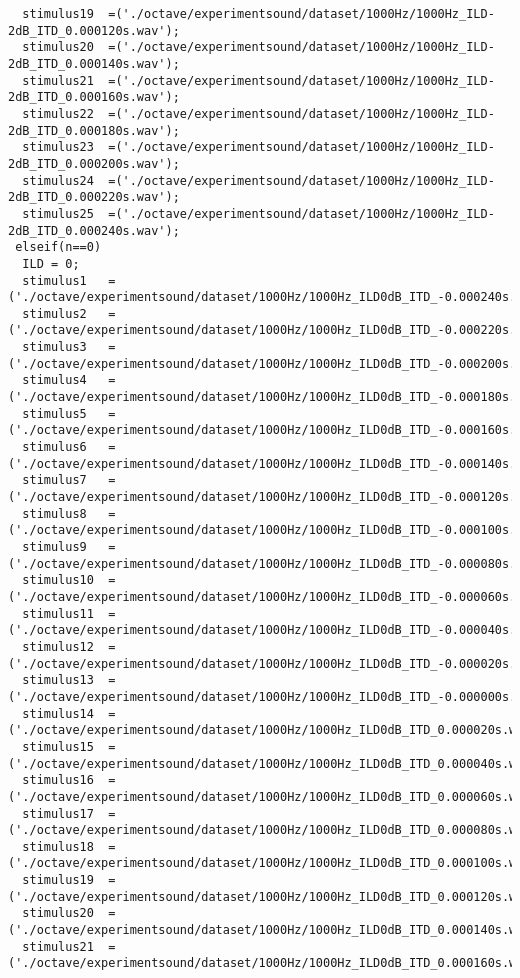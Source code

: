 {\begin{verbatim}
  stimulus19  =('./octave/experimentsound/dataset/1000Hz/1000Hz_ILD-2dB_ITD_0.000120s.wav');
  stimulus20  =('./octave/experimentsound/dataset/1000Hz/1000Hz_ILD-2dB_ITD_0.000140s.wav');
  stimulus21  =('./octave/experimentsound/dataset/1000Hz/1000Hz_ILD-2dB_ITD_0.000160s.wav');
  stimulus22  =('./octave/experimentsound/dataset/1000Hz/1000Hz_ILD-2dB_ITD_0.000180s.wav');
  stimulus23  =('./octave/experimentsound/dataset/1000Hz/1000Hz_ILD-2dB_ITD_0.000200s.wav');
  stimulus24  =('./octave/experimentsound/dataset/1000Hz/1000Hz_ILD-2dB_ITD_0.000220s.wav');
  stimulus25  =('./octave/experimentsound/dataset/1000Hz/1000Hz_ILD-2dB_ITD_0.000240s.wav');
 elseif(n==0)
  ILD = 0;
  stimulus1   =('./octave/experimentsound/dataset/1000Hz/1000Hz_ILD0dB_ITD_-0.000240s.wav');
  stimulus2   =('./octave/experimentsound/dataset/1000Hz/1000Hz_ILD0dB_ITD_-0.000220s.wav');
  stimulus3   =('./octave/experimentsound/dataset/1000Hz/1000Hz_ILD0dB_ITD_-0.000200s.wav');
  stimulus4   =('./octave/experimentsound/dataset/1000Hz/1000Hz_ILD0dB_ITD_-0.000180s.wav');
  stimulus5   =('./octave/experimentsound/dataset/1000Hz/1000Hz_ILD0dB_ITD_-0.000160s.wav');
  stimulus6   =('./octave/experimentsound/dataset/1000Hz/1000Hz_ILD0dB_ITD_-0.000140s.wav');
  stimulus7   =('./octave/experimentsound/dataset/1000Hz/1000Hz_ILD0dB_ITD_-0.000120s.wav');
  stimulus8   =('./octave/experimentsound/dataset/1000Hz/1000Hz_ILD0dB_ITD_-0.000100s.wav');
  stimulus9   =('./octave/experimentsound/dataset/1000Hz/1000Hz_ILD0dB_ITD_-0.000080s.wav');
  stimulus10  =('./octave/experimentsound/dataset/1000Hz/1000Hz_ILD0dB_ITD_-0.000060s.wav');
  stimulus11  =('./octave/experimentsound/dataset/1000Hz/1000Hz_ILD0dB_ITD_-0.000040s.wav');
  stimulus12  =('./octave/experimentsound/dataset/1000Hz/1000Hz_ILD0dB_ITD_-0.000020s.wav');
  stimulus13  =('./octave/experimentsound/dataset/1000Hz/1000Hz_ILD0dB_ITD_-0.000000s.wav');
  stimulus14  =('./octave/experimentsound/dataset/1000Hz/1000Hz_ILD0dB_ITD_0.000020s.wav');
  stimulus15  =('./octave/experimentsound/dataset/1000Hz/1000Hz_ILD0dB_ITD_0.000040s.wav');
  stimulus16  =('./octave/experimentsound/dataset/1000Hz/1000Hz_ILD0dB_ITD_0.000060s.wav');
  stimulus17  =('./octave/experimentsound/dataset/1000Hz/1000Hz_ILD0dB_ITD_0.000080s.wav');
  stimulus18  =('./octave/experimentsound/dataset/1000Hz/1000Hz_ILD0dB_ITD_0.000100s.wav');
  stimulus19  =('./octave/experimentsound/dataset/1000Hz/1000Hz_ILD0dB_ITD_0.000120s.wav');
  stimulus20  =('./octave/experimentsound/dataset/1000Hz/1000Hz_ILD0dB_ITD_0.000140s.wav');
  stimulus21  =('./octave/experimentsound/dataset/1000Hz/1000Hz_ILD0dB_ITD_0.000160s.wav');

\end{verbatim}}

